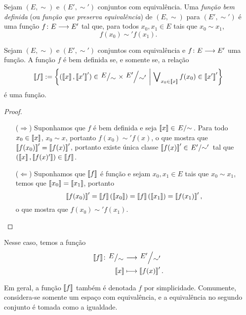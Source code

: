 \begin{definition}
	Sejam $(E,\sim)$ e $(E',\sim')$ conjuntos com equivalência. Uma \emph{função bem definida} (ou \emph{função que preserva equivalência}) de $(E,\sim)$ para $(E',\sim')$ é uma função ${f}\colon {E} \longrightarrow {E'}$ tal que, para todos $x_0,x_1 \in E$ tais que $x_0 \sim x_1$,
		\begin{equation*}
			f(x_0) \sim' f(x_1).
		\end{equation*}
\end{definition}

\begin{proposition}
	Sejam $(E,\sim)$ e $(E',\sim')$ conjuntos com equivalência e ${f}\colon {E} \longrightarrow {E'}$ uma função. A função $f$ é bem definida se, e somente se, a relação
		\begin{equation*}
			\cla{f} := \set{(\cla{x},\cla{x'}') \in \quo{E}{\sim} \times \quo{E'}{\sim'}}{\exists_{x_0 \in \cla{x}} f(x_0) \in \cla{x'}'}
		\end{equation*}
	é uma função.
\end{proposition}
\begin{proof}
	\begin{enumerate}
		\item [($\Rightarrow$)] Suponhamos que $f$ é bem definida e seja $\cla{x} \in \quo{E}{\sim}$. Para todo $x_0 \in \left\llbracket{x}\right\rrbracket$, $x_0 \sim x$, portanto $f(x_0) \sim' f(x)$, o que mostra que $\left\llbracket{f(x_0)}\right\rrbracket' = \left\llbracket{f(x)}\right\rrbracket'$, portanto existe única classe $\cla{f(x)}' \in \quo{E'}{\sim'}$ tal que $(\left\llbracket{x}\right\rrbracket,\left\llbracket{f(x)'}\right\rrbracket) \in \left\llbracket{f}\right\rrbracket$.
		
		\item [($\Leftarrow$)] Suponhamos que $\left\llbracket{f}\right\rrbracket$ é função e sejam $x_0,x_1 \in E$ tais que $x_0 \sim x_1$, temos que $\left\llbracket{x_0}\right\rrbracket = \left\llbracket{x_1}\right\rrbracket$, portanto
			\begin{equation*}
				\left\llbracket{f(x_0)}\right\rrbracket' = \left\llbracket{f}\right\rrbracket(\left\llbracket{x_0}\right\rrbracket) = \left\llbracket{f}\right\rrbracket(\left\llbracket{x_1}\right\rrbracket) = \left\llbracket{f(x_1)}\right\rrbracket',
			\end{equation*}
		o que mostra que $f(x_0) \sim' f(x_1)$.
	\end{enumerate}
\end{proof}

Nesse caso, temos a função
	\begin{align*}
		\func{\cla{f}}{\quo{E}{\sim}}{\quo{E'}{\sim'}}{\cla{x}}{\cla{f(x)}'}.
	\end{align*}

Em geral, a função $\left\llbracket{f}\right\rrbracket$ também é denotada $f$ por simplicidade. Comumente, considera-se somente um espaço com equivalência, e a equivalência no segundo conjunto é tomada como a igualdade.

